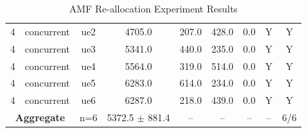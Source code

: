 \begin{table}[ht]
\begin{tabular}{|c|c|c|c|c|c|c|c|c|}
4 & concurrent & ue2 & 4705.0 & 207.0 & 428.0 & 0.0 & Y & Y \\
4 & concurrent & ue3 & 5341.0 & 440.0 & 235.0 & 0.0 & Y & Y \\
4 & concurrent & ue4 & 5564.0 & 319.0 & 514.0 & 0.0 & Y & Y \\
4 & concurrent & ue5 & 6283.0 & 614.0 & 234.0 & 0.0 & Y & Y \\
4 & concurrent & ue6 & 6287.0 & 218.0 & 439.0 & 0.0 & Y & Y \\
\multicolumn{2}{|c|}{\textbf{Aggregate}} & n=6 & 5372.5 $\pm$ 881.4 & -- & -- & -- & -- & 6/6 \\
\hline
\end{tabular}
\caption{AMF Re-allocation Experiment Results}
\label{tab:amf_realloc}
\end{table}
